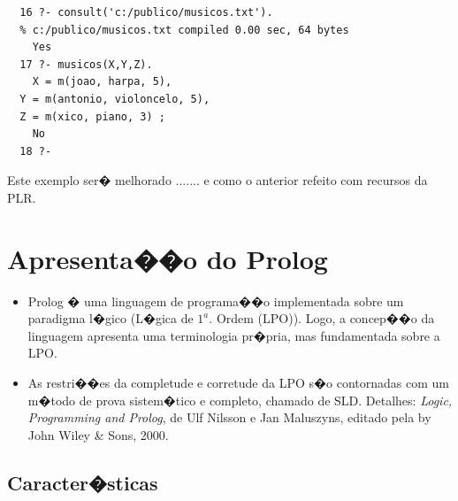 \documentclass[final,a4paper]{article}
\begin{document}
\begin{lstlisting}
  16 ?- consult('c:/publico/musicos.txt').
  % c:/publico/musicos.txt compiled 0.00 sec, 64 bytes
    Yes
  17 ?- musicos(X,Y,Z).
    X = m(joao, harpa, 5),
  Y = m(antonio, violoncelo, 5),
  Z = m(xico, piano, 3) ;
    No
  18 ?-
\end{lstlisting}
 Este exemplo ser� melhorado ....... e como
 o anterior refeito com recursos da PLR.

\section{Apresenta��o do Prolog}

\begin{itemize}


\item Prolog � uma
 linguagem de programa��o implementada sobre um
  paradigma  l�gico (L�gica de $1^a.$ Ordem (LPO)). Logo,
  a concep��o da linguagem apresenta uma terminologia
  pr�pria, mas fundamentada sobre a LPO. 
  
\item   As restri��es
  da completude e corretude da LPO s�o contornadas
  com um m�todo de prova sistem�tico e completo, chamado de SLD.
  Detalhes: {\em Logic, Programming and Prolog}, de
 Ulf Nilsson e Jan Maluszyns, editado pela by John Wiley \& Sons,
 2000.
\end{itemize}


\newpage
\subsection{Caracter�sticas}
\end{document}
